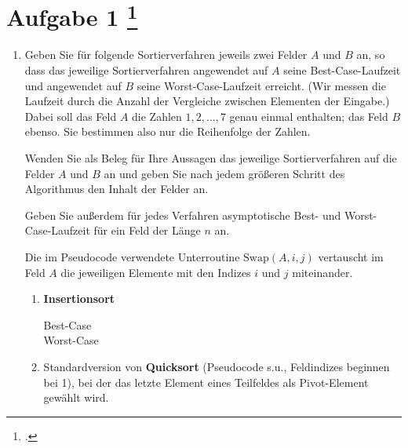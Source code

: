\documentclass{lehramt-informatik-aufgabe}
\begin{document}
\section{Aufgabe 1
\footcite{66115:2021:03}}

\begin{enumerate}


\item Geben Sie für folgende Sortierverfahren jeweils zwei Felder $A$
und $B$ an, so dass das jeweilige Sortierverfahren angewendet auf $A$
seine Best-Case-Laufzeit und angewendet auf $B$ seine
Worst-Case-Laufzeit erreicht. (Wir messen die Laufzeit durch die Anzahl
der Vergleiche zwischen Elementen der Eingabe.) Dabei soll das Feld $A$
die Zahlen $1,2,\dots,7$ genau einmal enthalten; das Feld $B$ ebenso.
Sie bestimmen also nur die Reihenfolge der Zahlen.

Wenden Sie als Beleg für Ihre Aussagen das jeweilige Sortierverfahren
auf die Felder $A$ und $B$ an und geben Sie nach jedem größeren Schritt
des Algorithmus den Inhalt der Felder an.

Geben Sie außerdem für jedes Verfahren asymptotische Best- und
Worst-Case-Laufzeit für ein Feld der Länge $n$ an.

Die im Pseudocode verwendete Unterroutine $\text{Swap} (A,i,j)$
vertauscht im Feld $A$ die jeweiligen Elemente mit den Indizes $i$ und
$j$ miteinander.
\begin{enumerate}


\item \textbf{Insertionsort}

\begin{liAntwort}
\begin{description}
\item[Best-Case] \strut


\item[Worst-Case] \strut

\end{description}
\end{liAntwort}


\item Standardversion von \textbf{Quicksort} (Pseudocode s.u.,
Feldindizes beginnen bei 1), bei der das letzte Element eines Teilfeldes
als Pivot-Element gewählt wird.


\end{enumerate}
\end{enumerate}
\end{document}
